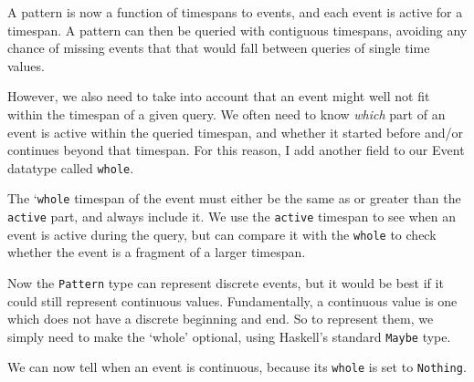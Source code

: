 A pattern is now a function of timespans to events, and each event is
active for a timespan. A pattern can then be queried with contiguous
timespans, avoiding any chance of missing events that that would fall
between queries of single time values.

However, we also need to take into account that an event might well not
fit within the timespan of a given query. We often need to know
\emph{which} part of an event is active within the queried timespan, and
whether it started before and/or continues beyond that timespan. For
this reason, I add another field to our Event datatype called
\texttt{whole}.

\begin{Shaded}
\begin{Highlighting}[]
 \OtherTok{=} \NormalTok{ \{} \NormalTok{,} \NormalTok{,}
\end{Highlighting}
\end{Shaded}

The `\texttt{whole} timespan of the event must either be the same as or
greater than the \texttt{active} part, and always include it. We use the
\texttt{active} timespan to see when an event is active during the
query, but can compare it with the \texttt{whole} to check whether the
event is a fragment of a larger timespan.

Now the \texttt{Pattern} type can represent discrete events, but it
would be best if it could still represent continuous values.
Fundamentally, a continuous value is one which does not have a discrete
beginning and end. So to represent them, we simply need to make the
`whole' optional, using Haskell's standard \texttt{Maybe} type.

\begin{Shaded}
\begin{Highlighting}[]
 \OtherTok{=} \NormalTok{ \{}  \NormalTok{,} \NormalTok{,}
\end{Highlighting}
\end{Shaded}

We can now tell when an event is continuous, because its \texttt{whole}
is set to \texttt{Nothing}.

